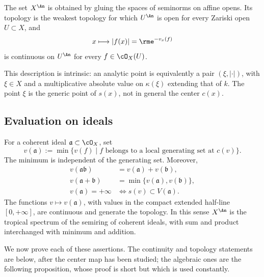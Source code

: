 \begin{definition}
\label{def:trivial-analytification}
The set $X^{\An}$ is obtained by gluing the spaces of seminorms on affine
opens.  Its topology is the weakest topology for which $U^{\An}$ is open
for every Zariski open $U\subset X$, and
\[
                  x\longmapsto |f(x)|=\rme^{-v_x(f)}
\]
is continuous on $U^{\An}$ for every $f\in\cO_X(U)$.
\end{definition}

This description is intrinsic: an analytic point is equivalently a pair
$(\xi,|\cdot|)$, with $\xi\in X$ and a multiplicative absolute value on
$\kappa(\xi)$ extending that of $k$.  The point $\xi$ is the generic
point of $s(x)$, not in general the center $c(x)$.

\subsection{Evaluation on ideals}
\label{sec:ch32-ideals}

For a coherent ideal $\mathfrak a\subset\cO_X$, set
\begin{equation}
\label{eq:ideal-evaluation-triv}
 v(\mathfrak a):=
 \min\{v(f)\mid f\text{ belongs to a local generating set at }c(v)\}.
\end{equation}
The minimum is independent of the generating set.  Moreover,
\begin{equation}
\label{eq:ideal-tropical-identities}
\begin{split}
 v(\mathfrak a\mathfrak b)&=v(\mathfrak a)+v(\mathfrak b),\\
 v(\mathfrak a+\mathfrak b)&=\min\{v(\mathfrak a),v(\mathfrak b)\},\\
 v(\mathfrak a)=+\infty&\Longleftrightarrow
                         s(v)\subset V(\mathfrak a).
\end{split}
\end{equation}
The functions $v\mapsto v(\mathfrak a)$, with values in the compact
extended half-line $[0,+\infty]$, are continuous and generate the topology.
In this sense $X^{\An}$ is the tropical spectrum of the semiring of coherent
ideals, with sum and product interchanged with minimum and addition.

We now prove each of these assertions.  The continuity and topology
statements are  below, after the center map
has been studied; the algebraic ones are the following proposition, whose
proof is short but which is used constantly.

